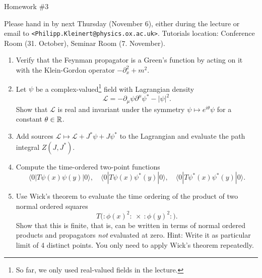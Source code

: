 \documentclass[12pt]{article}
\begin{document}
\begin{center}
  {\Huge Homework \#3}
\end{center}
\vspace{1cm}

\noindent Please hand in by next Thursday (November 6), either during the
lecture or email to \texttt{<Philipp.Kleinert@physics.ox.ac.uk>}.
Tutorials location: Conference Room (31. October), Seminar Room
(7. November).



\begin{enumerate}
\item Verify that the Feynman propagator is a Green's function by
  acting on it with the Klein-Gordon operator $-\partial_x^2+m^2$.
\item Let $\psi$ be a complex-valued\footnote{So far, we only used
    real-valued fields in the lecture.} field with Lagrangian density
  \begin{equation}
    \mathcal{L} = -\partial_\mu \psi \partial^\mu \psi^* - |\psi|^2.
  \end{equation}
  Show that $\mathcal{L}$ is real and invariant under the symmetry
  $\psi \mapsto e^{i\theta} \psi$ for a constant $\theta\in{\mathbb{R}}$.
\item Add sources $\mathcal{L} \mapsto \mathcal{L} + J^* \psi + J
  \psi^*$ to the Lagrangian and evaluate the path integral $Z(J,
  J^*)$.
\item Compute the time-ordered two-point functions
  \begin{equation}
    \langle 0 | T \psi(x) \psi(y) |0\rangle, \quad
    \langle 0 | T \psi(x) \psi^*(y) |0\rangle, \quad
    \langle 0 | T \psi^*(x) \psi^*(y) |0\rangle.
  \end{equation}
\item Use Wick's theorem to evaluate the time ordering of the product
  of two normal ordered squares
  \begin{equation}
    T\Big(:\phi(x)^2:~\times~:\phi(y)^2:\Big).
  \end{equation}
  Show that this is finite, that is, can be written in terms of normal
  ordered products and propagators \emph{not} evaluated at zero. Hint:
  Write it as particular limit of 4 distinct points. You only need
  to apply Wick's theorem repeatedly.
\end{enumerate}
\end{document}
